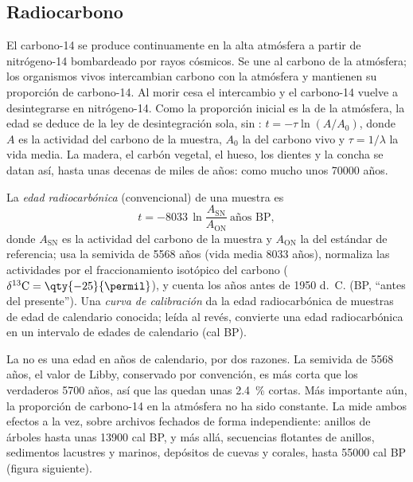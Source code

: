 \subsection*{Radiocarbono}

El carbono-14 se produce continuamente en la alta atmósfera a partir de nitrógeno-14 bombardeado por rayos cósmicos. Se une al carbono de la atmósfera; los organismos vivos
intercambian carbono con la atmósfera y mantienen su proporción de carbono-14. Al morir cesa el intercambio y el carbono-14 vuelve a desintegrarse en nitrógeno-14. Como la proporción inicial es la de la atmósfera, la edad se deduce de la ley de desintegración sola, sin : $t = -\tau \ln(A/A_0)$, donde $A$ es la
actividad del carbono de la muestra, $A_0$ la del carbono vivo y $\tau =
1/\lambda$ la vida media. La madera, el carbón vegetal, el hueso, los dientes y la concha se datan así, hasta unas decenas de miles de años: como mucho unos \num{70000} años.

\begin{definition}\label{def:b1:radiometric-methods:radiocarbon}
La \emph{edad radiocarbónica} (convencional) de una muestra es
\[
  t = -8033 \,\ln \frac{A_{\mathrm{SN}}}{A_{\mathrm{ON}}} \ \text{años BP},
\]
donde $A_{\mathrm{SN}}$ es la actividad del carbono de la muestra y
$A_{\mathrm{ON}}$ la del estándar de referencia; usa la semivida de
\num{5568} años (vida media \num{8033} años), normaliza las actividades por el fraccionamiento isotópico del carbono ($\delta^{13}\mathrm{C} = \qty{-25}{\permil}$), y cuenta los años antes de 1950 d.~C. (BP, ``antes del presente''). Una
\emph{curva de calibración} da la edad radiocarbónica de muestras de edad de calendario conocida; leída al revés, convierte una edad radiocarbónica en un intervalo de edades de calendario (cal BP).
\end{definition}

La  no es una edad en años de calendario, por dos razones. La semivida de \num{5568} años, el valor de Libby, conservado por convención, es más corta que los verdaderos \num{5700} años, así que las  quedan unas
\qty{2.4}{\percent} cortas. Más importante aún, la proporción de carbono-14 en la atmósfera no ha sido constante. La  mide ambos efectos a la vez, sobre archivos fechados de forma independiente: anillos de árboles hasta unas
\num{13900} cal BP, y más allá, secuencias flotantes de anillos, sedimentos lacustres y marinos, depósitos de cuevas y corales, hasta \num{55000} cal BP (figura siguiente).

